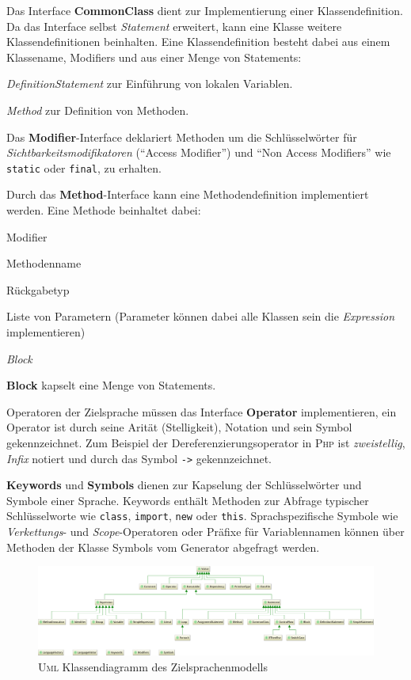 Das Interface \textbf{CommonClass} dient zur Implementierung einer Klassendefinition. Da das Interface selbst \emph{Statement} erweitert, kann eine Klasse weitere Klassendefinitionen beinhalten. Eine Klassendefinition besteht dabei aus einem Klassename, Modifiers und aus einer Menge von Statements:
\begin{compactitem}
    \item \emph{DefinitionStatement} zur Einführung von lokalen Variablen.
    \item \emph{Method} zur Definition von Methoden.
\end{compactitem}

Das \textbf{Modifier}-Interface deklariert Methoden um die Schlüsselwörter für \emph{Sichtbarkeitsmodifikatoren} (\enquote{Access Modifier}) und \enquote{Non Access Modifiers} wie \texttt{static} oder \texttt{final}, zu erhalten.

Durch das \textbf{Method}-Interface kann eine Methodendefinition implementiert werden. Eine Methode beinhaltet dabei:
\begin{compactitem}
    \item Modifier
    \item Methodenname
    \item Rückgabetyp
    \item Liste von Parametern (Parameter können dabei alle Klassen sein die \emph{Expression} implementieren) %
    \item \emph{Block}
\end{compactitem}

\textbf{Block} kapselt eine Menge von Statements.

Operatoren der Zielsprache müssen das Interface \textbf{Operator} implementieren, ein Operator ist durch seine Arität (Stelligkeit), Notation und sein Symbol gekennzeichnet. Zum Beispiel der Dereferenzierungsoperator in \textsc{Php} ist \emph{zweistellig}, \emph{Infix} notiert und durch das Symbol \texttt{->} gekennzeichnet.

\textbf{Keywords} und \textbf{Symbols} dienen zur Kapselung der Schlüsselwörter und Symbole einer Sprache. Keywords enthält Methoden zur Abfrage typischer Schlüsselworte wie \texttt{class}, \texttt{import}, \texttt{new} oder \texttt{this}. Sprachspezifische Symbole wie \emph{Verkettungs}- und \emph{Scope}-Operatoren oder Präfixe für Variablennamen können über Methoden der Klasse Symbols vom Generator abgefragt werden.

\begin{figure}
    \centering
    \includegraphics[width=\textheight]{resources/languagemodel_common}
    \caption{\textsc{Uml} Klassendiagramm des Zielsprachenmodells}
    \label{fig:language_model}
\end{figure}
